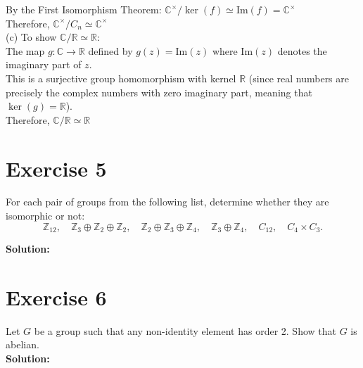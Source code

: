 \documentclass{article}
\begin{document}
By the First Isomorphism Theorem:
$\mathbb{C}^\times/\ker(f) \simeq \text{Im}(f) = \mathbb{C}^\times$ \\

Therefore, $\mathbb{C}^\times/C_n \simeq \mathbb{C}^\times$ \\

(c) To show $\mathbb{C}/\mathbb{R} \simeq \mathbb{R}$: \\

The map $g: \mathbb{C} \to \mathbb{R}$ defined by $g(z) = \text{Im}(z)$
where $\text{Im}(z)$ denotes the imaginary part of $z$. \\

This is a surjective group homomorphism with kernel $\mathbb{R}$
(since real numbers are precisely the complex numbers with zero imaginary part, meaning that $\ker(g) = \mathbb{R}$). \\

Therefore, $\mathbb{C}/\mathbb{R} \simeq \mathbb{R}$

\newpage

\section*{Exercise 5}
For each pair of groups from the following list, determine whether they are isomorphic or not:
\[ \mathbb{Z}_{12}, \quad \mathbb{Z}_3 \oplus \mathbb{Z}_2 \oplus \mathbb{Z}_2, \quad \mathbb{Z}_2 \oplus \mathbb{Z}_3 \oplus \mathbb{Z}_4, \quad \mathbb{Z}_3 \oplus \mathbb{Z}_4, \quad C_{12}, \quad C_4 \times C_3. \]

\textbf{Solution:} \\



\newpage

\section*{Exercise 6}
Let $G$ be a group such that any non-identity element has order 2. Show that $G$ is abelian. \\

\textbf{Solution:} \\
\end{document}
